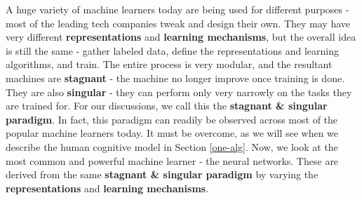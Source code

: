 \documentclass[12pt]{article}  %
\begin{document}
A huge variety of machine learners today are being used for different purposes - most of the leading tech companies tweak and design their own. They may have very different {\bf representations} and {\bf learning mechanisms}, but the overall idea is still the same - gather labeled data, define the representations and learning algorithms, and train. The entire process is very modular, and the resultant machines are {\bf stagnant} - the machine no longer improve once training is done. They are also {\bf singular} - they can perform only very narrowly on the tasks they are trained for. For our discussions, we call this the {\bf stagnant \& singular paradigm}. In fact, this paradigm can readily be observed across most of the popular machine learners today. It must be overcome, as we will see when we describe the human cognitive model in Section \ref{one-alg}. Now, we look at the most common and powerful machine learner - the neural networks. These are derived from the same {\bf stagnant \& singular paradigm} by varying the {\bf representations} and {\bf learning mechanisms}.





\end{document}
